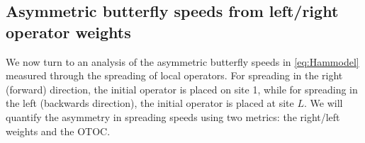\documentclass[aps,prx,reprint,superscriptaddress, longbibliography]{revtex4-1}
\begin{document}



\subsection{Asymmetric butterfly speeds from left/right operator weights}

We now turn to an analysis of the asymmetric butterfly speeds in \eqref{eq:Hammodel} measured through the spreading of local operators. For spreading in the right (forward) direction, the initial operator is placed on site 1, while for spreading in the left (backwards direction), the initial operator is placed at site $L$. We will quantify the asymmetry in spreading speeds using two metrics: the right/left weights and the OTOC. 
\end{document}
